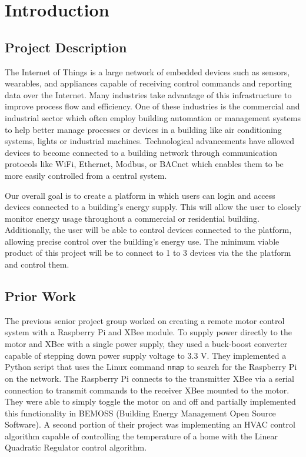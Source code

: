 \chapter{Introduction}
\label{ch: Chapter1}

\section{Project Description}
The Internet of Things is a large network of embedded devices such as sensors, wearables, and appliances capable of receiving control commands and reporting
data over the Internet. Many industries take advantage of this infrastructure to
improve process flow and efficiency. One of these industries is the commercial
and industrial sector which often employ building automation or management
systems to help better manage processes or devices in a building like air
conditioning systems, lights or industrial machines. Technological advancements
have allowed devices to become connected to a building network through
communication protocols like WiFi, Ethernet, Modbus, or BACnet which enables
them to be more easily controlled from a central system.


Our overall goal is to create a platform in which users can login and access devices
connected to a building's energy supply. This will allow the user to closely
monitor energy usage throughout a commercial or residential building.
Additionally, the user will be able to control devices connected to the
platform, allowing precise control over the building's energy use. The minimum
viable product of this project will be to connect to 1 to 3 devices via the the
platform and control them.

\section{Prior Work}
The previous senior project group worked on creating a remote motor control system with a Raspberry Pi and XBee module. To supply power directly to the motor and XBee with a single power supply, they used a buck-boost converter capable of stepping down power supply voltage to 3.3 V. They implemented a Python script that uses the Linux command \texttt{nmap} to search for the Raspberry Pi on the network. The Raspberry Pi connects to the transmitter XBee via a serial connection to transmit commands to the receiver XBee mounted to the motor. They were able to simply toggle the motor on and off and partially implemented this functionality in BEMOSS (Building Energy Management Open Source Software). A second portion of their project was implementing an HVAC control algorithm capable of controlling the temperature of a home with the Linear Quadratic Regulator control algorithm.

